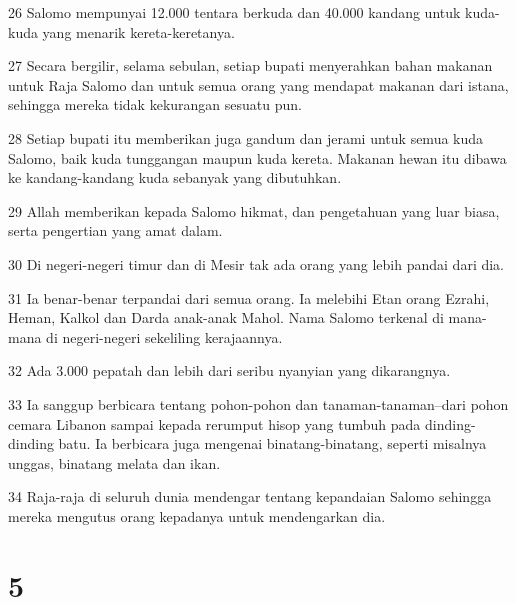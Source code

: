 \par 26 Salomo mempunyai 12.000 tentara berkuda dan 40.000 kandang untuk kuda-kuda yang menarik kereta-keretanya.
\par 27 Secara bergilir, selama sebulan, setiap bupati menyerahkan bahan makanan untuk Raja Salomo dan untuk semua orang yang mendapat makanan dari istana, sehingga mereka tidak kekurangan sesuatu pun.
\par 28 Setiap bupati itu memberikan juga gandum dan jerami untuk semua kuda Salomo, baik kuda tunggangan maupun kuda kereta. Makanan hewan itu dibawa ke kandang-kandang kuda sebanyak yang dibutuhkan.
\par 29 Allah memberikan kepada Salomo hikmat, dan pengetahuan yang luar biasa, serta pengertian yang amat dalam.
\par 30 Di negeri-negeri timur dan di Mesir tak ada orang yang lebih pandai dari dia.
\par 31 Ia benar-benar terpandai dari semua orang. Ia melebihi Etan orang Ezrahi, Heman, Kalkol dan Darda anak-anak Mahol. Nama Salomo terkenal di mana-mana di negeri-negeri sekeliling kerajaannya.
\par 32 Ada 3.000 pepatah dan lebih dari seribu nyanyian yang dikarangnya.
\par 33 Ia sanggup berbicara tentang pohon-pohon dan tanaman-tanaman--dari pohon cemara Libanon sampai kepada rerumput hisop yang tumbuh pada dinding-dinding batu. Ia berbicara juga mengenai binatang-binatang, seperti misalnya unggas, binatang melata dan ikan.
\par 34 Raja-raja di seluruh dunia mendengar tentang kepandaian Salomo sehingga mereka mengutus orang kepadanya untuk mendengarkan dia.

\chapter{5}

